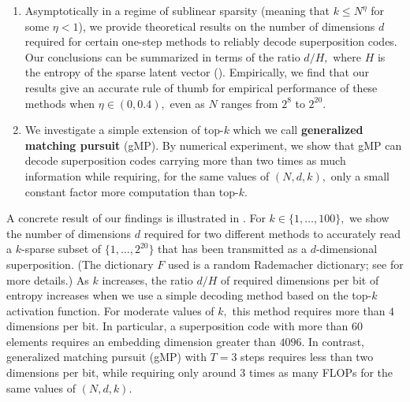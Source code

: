 \begin{tcolorbox}
\begin{enumerate}[leftmargin=*]
\item Asymptotically in a regime of sublinear sparsity (meaning that $k \le N^\eta$ for some $\eta < 1$), we provide theoretical results on the number of dimensions $d$ required for certain one-step methods to reliably decode superposition codes. Our conclusions can be summarized in terms of the ratio $d/H,$ where $H$ is the entropy of the sparse latent vector (). Empirically, we find that our results give an accurate rule of thumb for empirical performance of these methods when $\eta \in (0, 0.4),$ even as $N$ ranges from $2^8$ to $2^{20}.$
\item We investigate a simple extension of top-$k$ which we call \textbf{generalized matching pursuit} (gMP). By numerical experiment, we show that gMP can decode superposition codes carrying more than two times as much information while requiring, for the same values of $(N, d, k),$ only a small constant factor more computation than top-$k$.
\end{enumerate}
\end{tcolorbox}

A concrete result of our findings is illustrated in . For $k \in \{1, \dots, 100 \},$ we show the number of dimensions $d$ required for two different methods to accurately read a $k$-sparse subset of $\{1, \dots, 2^{20}\}$ that has been transmitted as a $d$-dimensional superposition. (The dictionary $F$ used is a random Rademacher dictionary; see  for more details.) As $k$ increases, the ratio $d/H$ of required dimensions per bit of entropy increases when we use a simple decoding method based on the top-$k$ activation function. For moderate values of $k,$ this method requires more than $4$ dimensions per bit. In particular, a superposition code with more than $60$ elements requires an embedding dimension greater than $4096.$ In contrast, generalized matching pursuit (gMP) with $T = 3$ steps requires less than two dimensions per bit, while requiring only around $3$ times as many FLOPs for the same values of $(N, d, k).$


